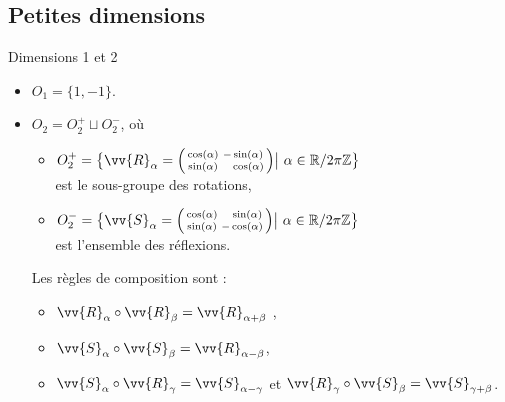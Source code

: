 \documentclass{m53beamer}
\begin{document}
\subsection{Petites dimensions}
\begin{frame}{Dimensions 1 et 2}
  \begin{itemize}[<+(1)->]
    \item $O_{1} = \{1,-1\}$.
    \item $O_{2} = O_{2}^{+} \sqcup O_{2}^{-}$, où
      \begin{itemize}[<+(1)->]
        \item $O_{2}^{+}=\big\{ \vv{R}_{\alpha}=\begin{psmallmatrix}\cos(\alpha)&-\sin(\alpha)\\\sin(\alpha)&\phantom{-}\cos(\alpha)\end{psmallmatrix} \big|\ \alpha \in \mathbb{R}/2\pi\mathbb{Z} \big\}$\\ est le sous-groupe des rotations,
        \item $O_{2}^{-}=\big\{ \vv{S}_{\alpha}=\begin{psmallmatrix}\cos(\alpha)&\phantom{-}\sin(\alpha)\\\sin(\alpha)&-\cos(\alpha)\end{psmallmatrix} \big|\ \alpha \in \mathbb{R}/2\pi\mathbb{Z} \big\}$\\ est l'ensemble des réflexions.\pause\\
      \end{itemize}\pause
      Les règles de composition sont :
      \begin{itemize}[<+(1)->]
        \item $\vv{R}_{\alpha}\circ \vv{R}_{\beta} = \vv{R}_{\alpha+\beta}$ \pause{},
        \item $\vv{S}_{\alpha}\circ \vv{S}_{\beta} = \vv{R}_{\alpha-\beta}$,
        \item $\vv{S}_{\alpha}\circ \vv{R}_{\gamma} = \vv{S}_{\alpha-\gamma}$ et $\vv{R}_{\gamma}\circ \vv{S}_{\beta} = \vv{S}_{\gamma+\beta}$.
      \end{itemize}\pause
  \end{itemize}
\end{frame}
\end{document}
